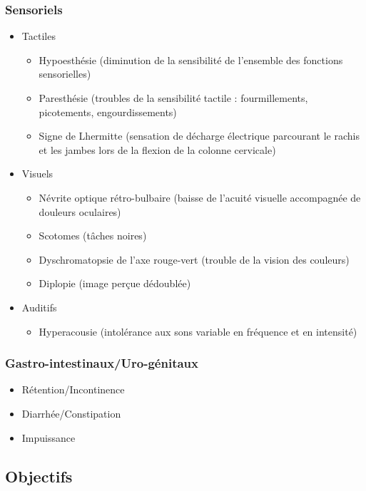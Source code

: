 \documentclass[a4paper,12pt,francais]{article}
\begin{document}
\subsubsection{Sensoriels}
\begin{itemize}
	\item Tactiles
		\begin{itemize}
			\item Hypoesthésie (diminution de la sensibilité de l'ensemble des fonctions sensorielles)
	  		\item Paresthésie (troubles de la sensibilité tactile : fourmillements, picotements, engourdissements)
	    	\item Signe de Lhermitte (sensation de décharge électrique parcourant le rachis et les jambes lors de la flexion de la colonne cervicale)
		\end{itemize}
	\item Visuels
		\begin{itemize}
			\item Névrite optique rétro-bulbaire (baisse de l'acuité visuelle accompagnée de douleurs oculaires)
 	    	\item Scotomes (tâches noires)
	    	\item Dyschromatopsie de l'axe rouge-vert (trouble de la vision des couleurs)
			\item Diplopie (image perçue dédoublée)
		\end{itemize}
	\item Auditifs
		\begin{itemize}
			\item Hyperacousie (intolérance aux sons variable en fréquence et en intensité)
		\end{itemize}
\end{itemize}
\subsubsection{Gastro-intestinaux/Uro-génitaux}
\begin{itemize}
    \item Rétention/Incontinence
    \item Diarrhée/Constipation
    \item Impuissance
\end{itemize}
\subsection{Objectifs} %
\end{document}
